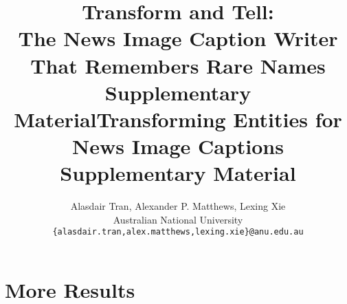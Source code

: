 \documentclass[10pt,twocolumn,letterpaper]{article}
\begin{document}
\title{Transform and Tell:\\The News Image Caption Writer That Remembers Rare Names\\Supplementary Material}
\title{Transforming Entities for News Image Captions\\Supplementary Material}

\author{Alasdair Tran, Alexander P. Matthews, Lexing Xie\\
Australian National University\\
{\tt\small \{alasdair.tran,alex.matthews,lexing.xie\}@anu.edu.au}
}

\maketitle

\section{More Results}
\end{document}

